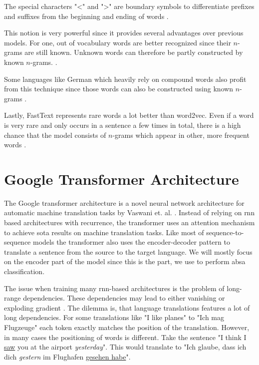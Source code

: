 The special characters "<" and ">" are boundary symbols to differentiate prefixes and suffixes from the beginning and ending of words \cite{Bojanowski2017}.
\medskip

This notion is very powerful since it provides several advantages over previous models. For one, out of vocabulary words are better recognized since their $n$-grams are still known. Unknown words can therefore be partly constructed by known $n$-grams. \cite{Bojanowski2017}. 
\medskip

Some languages like German which heavily rely on compound words also profit from this technique since those words can also be constructed using known $n$-grams \cite{Bojanowski2017}.
\medskip

Lastly, FastText represents rare words a lot better than word2vec. Even if a word is very rare and only occurs in a sentence a few times in total, there is a high chance that the model consists of $n$-grams which appear in other, more frequent words \cite{Bojanowski2017}.

\section{Google Transformer Architecture}
\label{sec:03_transformer}
The Google transformer architecture is a novel neural network architecture for automatic machine translation tasks by Vaswani et. al. \cite{Vaswani2017d}. Instead of relying on \gls{rnn} based architectures with recurrence, the transformer uses an attention mechanism to achieve \gls{sota} results on machine translation tasks. Like most of sequence-to-sequence models the transformer also uses the encoder-decoder pattern to translate a sentence from the source to the target language. We will mostly focus on the encoder part of the model since this is the part, we use to perform \gls{absa} classification.
\medskip

The issue when training many \gls{rnn}-based architectures is the problem of long-range dependencies. These dependencies may lead to either vanishing or exploding gradient \cite{Hochreiter2009}. The dilemma is, that language translations features a lot of long dependencies. For some translations like "I like planes" to "Ich mag Flugzeuge" each token exactly matches the position of the translation. However, in many cases the positioning of words is different. Take the sentence "I think I \underline{saw} you at the airport \emph{yesterday}". This would translate to "Ich glaube, dass ich dich \emph{gestern} im Flughafen \underline{gesehen habe}".

